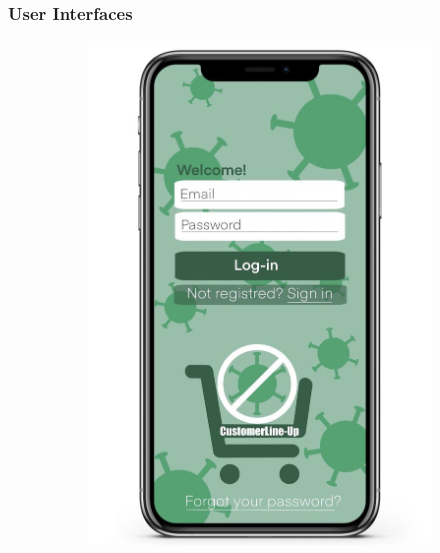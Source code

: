 \documentclass[a4paper, 12pt, oneside]{article}
\begin{document}
\subsubsection{User Interfaces}
\begin{figure}[hbt]
\centering
\begin{subfigure}
    \centering
    \includegraphics[height=0.26\textheight, scale=0.2, keepaspectratio]{img/GUI/login.jpg} 
 \end{subfigure}
 \begin{subfigure}
    \centering

\end{subfigure}
\end{figure}
\end{document}
